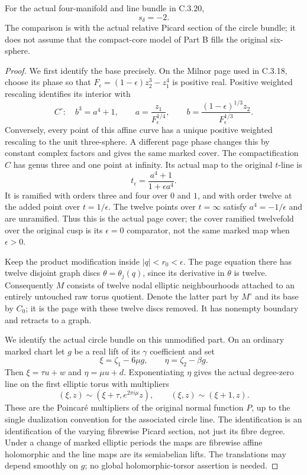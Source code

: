 \begin{proposition}
For the actual four-manifold and line bundle in C.3.20,
\[
 s_\delta=-2.
\]
The comparison is with the actual relative Picard section of
the circle bundle; it does not assume that the compact-core
model of Part B fills the original six-sphere.
\end{proposition}
\begin{proof}
We first identify the base precisely. On the Milnor page used in
C.3.18, choose its phase so that
$F_\epsilon=(1-\epsilon)z_2^3-z_1^4$ is positive real.
Positive weighted rescaling identifies its interior with
\[
 C^\circ:\quad b^3=a^4+1,
 \qquad
 a=\frac{z_1}{F_\epsilon^{1/4}},\qquad
 b=\frac{(1-\epsilon)^{1/3}z_2}{F_\epsilon^{1/3}}.
\]
Conversely, every point of this affine curve has a unique
positive weighted rescaling to the unit three-sphere. A different
page phase changes this by constant complex factors and gives
the same marked cover. The compactification $C$ has genus three
and one point at infinity. Its actual map to the original
$t$-line is
\[
 t_\epsilon=\frac{a^4+1}{1+\epsilon a^4}.
\]
It is ramified with orders three and four over $0$ and $1$,
and with order twelve at the added point over $t=1/\epsilon$.
The twelve points over $t=\infty$ satisfy
$a^4=-1/\epsilon$ and are unramified. Thus this is the
actual page cover; the cover ramified twelvefold over the
original cusp is its $\epsilon=0$ comparator, not the same
marked map when $\epsilon>0$.

Keep the product modification inside $|q|<r_0<\epsilon$.
The page equation there has twelve disjoint graph discs
$\theta=\theta_j(q)$, since its derivative in $\theta$ is
twelve. Consequently $M$ consists of twelve nodal elliptic
neighbourhoods attached to an entirely untouched raw torus
quotient. Denote the latter part by $M^\circ$ and its base by
$C_0$; it is the page with these twelve discs removed. It has
nonempty boundary and retracts to a graph.

We identify the actual circle bundle on this unmodified part.
On an ordinary marked chart let $g$ be a real lift of its
$\gamma$ coefficient and set
\[
 \xi=\zeta_1-6\mu g,\qquad
 \eta=\zeta_2-\beta g.
\]
Then $\xi=\tau u+w$ and $\eta=\mu u+d$. Exponentiating
$\eta$ gives the actual degree-zero line on the first elliptic
torus with multipliers
\[
 (\xi,z)\sim(\xi+\tau,e^{2\pi i\mu}z),\qquad
 (\xi,z)\sim(\xi+1,z).
\]
These are the Poincar\'e multipliers of the original normal
function $P$, up to the single dualization convention for the
associated circle line. The identification is an identification
of the varying fibrewise Picard section, not just its fibre
degree. Under a change of marked elliptic periods the maps are
fibrewise affine holomorphic and the line maps are its
semiabelian lifts. The translations may depend smoothly on
$g$; no global holomorphic-torsor assertion is needed.


\end{proof}
